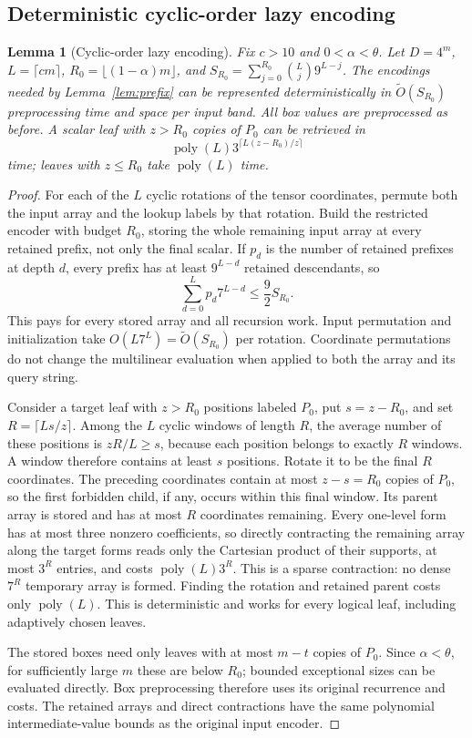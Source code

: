 \documentclass[11pt]{article}
\newtheorem{lemma}[theorem]{Lemma}
\begin{document}
\subsection*{Deterministic cyclic-order lazy encoding}
\begin{lemma}[Cyclic-order lazy encoding]
\label{lem:cyclic-lazy}
Fix $c>10$ and $0<\alpha<\theta$. Let $D=4^m$, $L=\lceil cm\rceil$,
$R_0=\lfloor(1-\alpha)m\rfloor$, and
$S_{R_0}=\sum_{j=0}^{R_0}\binom Lj9^{L-j}$. The encodings needed by
Lemma~\ref{lem:prefix} can be represented deterministically in
$\widetilde O(S_{R_0})$ preprocessing time and space per input band.
All box values are preprocessed as before. A scalar leaf with $z>R_0$
copies of $P_0$ can be retrieved in
\[
\operatorname{poly}(L)3^{\lceil L(z-R_0)/z\rceil}
\]
time; leaves with $z\le R_0$ take $\operatorname{poly}(L)$ time.
\end{lemma}
\begin{proof}
For each of the $L$ cyclic rotations of the tensor coordinates, permute
both the input array and the lookup labels by that rotation. Build the
restricted encoder with budget $R_0$, storing the whole remaining input
array at every retained prefix, not only the final scalar. If $p_d$ is the
number of retained prefixes at depth $d$, every prefix has at least
$9^{L-d}$ retained descendants, so
\[
\sum_{d=0}^Lp_d7^{L-d}\le \frac92 S_{R_0}.
\]
This pays for every stored array and all recursion work. Input permutation
and initialization take $O(L7^L)=\widetilde O(S_{R_0})$ per rotation.
Coordinate permutations do not change the multilinear evaluation when
applied to both the array and its query string.

Consider a target leaf with $z>R_0$ positions labeled $P_0$, put
$s=z-R_0$, and set $R=\lceil Ls/z\rceil$. Among the $L$ cyclic windows of
length $R$, the average number of these positions is $zR/L\ge s$,
because each position belongs to exactly $R$ windows. A window therefore
contains at least $s$ positions. Rotate it to be the final $R$ coordinates.
The preceding coordinates contain at most $z-s=R_0$ copies of $P_0$, so
the first forbidden child, if any, occurs within this final window. Its
parent array is stored and has at most $R$ coordinates remaining. Every
one-level form has at most three nonzero coefficients, so directly
contracting the remaining array along the target forms reads only the
Cartesian product of their supports, at most $3^R$ entries, and costs
$\operatorname{poly}(L)3^R$. This is a sparse contraction: no dense
$7^R$ temporary array is formed. Finding the rotation and retained parent costs
only $\operatorname{poly}(L)$. This is deterministic and works for every
logical leaf, including adaptively chosen leaves.

The stored boxes need only leaves with at most $m-t$ copies of $P_0$.
Since $\alpha<\theta$, for sufficiently large $m$ these are below $R_0$;
bounded exceptional sizes can be evaluated directly. Box preprocessing
therefore uses its original recurrence and costs. The retained arrays and
direct contractions have the same polynomial intermediate-value bounds as
the original input encoder.
\end{proof}
\end{document}
